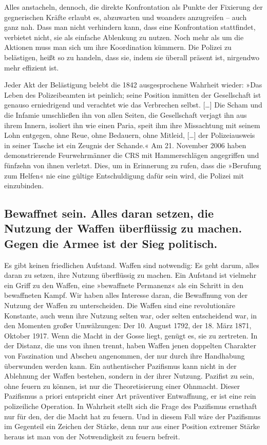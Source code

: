 Alles anstacheln, dennoch, die direkte Konfrontation als Punkte der
Fixierung der gegnerischen Kräfte erlaubt es, abzuwarten und
woanders anzugreifen – auch ganz nah. Dass man nicht verhindern
kann, dass eine Konfrontation stattfindet, verbietet nicht, sie als
einfache Ablenkung zu nutzen. Noch mehr als um die Aktionen muss
man sich um ihre Koordination kümmern. Die Polizei zu belästigen,
heißt so zu handeln, dass sie, indem sie überall präsent ist,
nirgendwo mehr effizient ist.

Jeder Akt der Belästigung belebt die 1842 ausgesprochene Wahrheit
wieder: »Das Leben des Polizeibeamten ist peinlich; seine Position
inmitten der Gesellschaft ist genauso erniedrigend und verachtet
wie das Verbrechen selbst. […] Die Scham und die Infamie
umschließen ihn von allen Seiten, die Gesellschaft verjagt ihn aus
ihrem Innern, isoliert ihn wie einen Paria, speit ihm ihre
Missachtung mit seinem Lohn entgegen, ohne Reue, ohne Bedauern,
ohne Mitleid, […] der Polizeiausweis in seiner Tasche ist ein
Zeugnis der Schande.« Am 21. November 2006 haben demonstrierende
Feurwehrmänner die CRS mit Hammerschlägen angegriffen und fünfzehn
von ihnen verletzt. Dies, um in Erinnerung zu rufen, dass die
»Berufung zum Helfen« nie eine gültige Entschuldigung dafür sein
wird, die Polizei mit einzubinden.

\subsection{Bewaffnet sein. Alles daran setzen, die Nutzung der Waffen 
überflüssig zu machen. Gegen die Armee ist der Sieg politisch.}

Es gibt keinen friedlichen Aufstand. Waffen sind notwendig: Es geht
darum, alles daran zu setzen, ihre Nutzung überflüssig zu machen.
Ein Aufstand ist vielmehr ein Griff zu den Waffen, eine »bewaffnete
Permanenz« als ein Schritt in den bewaffneten Kampf. Wir haben
alles Interesse daran, die Bewaffnung von der Nutzung der Waffen zu
unterscheiden. Die Waffen sind eine revolutionäre Konstante, auch
wenn ihre Nutzung selten war, oder selten entscheidend war, in den
Momenten großer Umwälzungen: Der 10. August 1792, der 18. März
1871, Oktober 1917. Wenn die Macht in der Gosse liegt, genügt es,
sie zu zertreten.
In der Distanz, die uns von ihnen trennt, haben Waffen jenen
doppelten Charakter von Faszination und Abscheu angenommen, der nur
durch ihre Handhabung überwunden werden kann. Ein authentischer
Pazifismus kann nicht in der Ablehnung der Waffen bestehen, sondern
in der ihrer Nutzung. Pazifist zu sein, ohne feuern zu können, ist
nur die Theoretisierung einer Ohnmacht. Dieser Pazifismus a priori
entspricht einer Art präventiver Entwaffnung, er ist eine rein
polizeiliche Operation. In Wahrheit stellt sich die Frage des
Pazifismus ernsthaft nur für den, der die Macht hat zu feuern. Und
in diesem Fall wäre der Pazifismus im Gegenteil ein Zeichen der
Stärke, denn nur aus einer Position extremer Stärke heraus ist man
von der Notwendigkeit zu feuern befreit.

